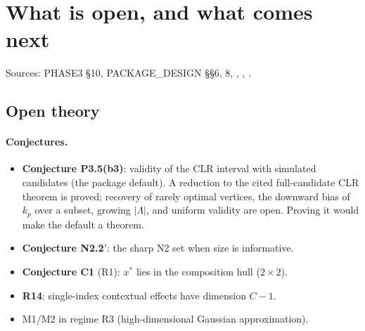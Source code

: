 \section{What is open, and what comes next}\label{sec:open}

Sources: PHASE3 \S10, PACKAGE\_DESIGN \S\S6, 8, ,
, .

\subsection{Open theory}

\paragraph{Conjectures.}
\begin{itemize}[nosep]
\item \textbf{Conjecture P3.5(b3)}: validity of the CLR interval with simulated
candidates (the package default). A reduction to the cited full-candidate CLR
theorem is proved; recovery of rarely optimal vertices, the downward bias of $k_p$
over a subset, growing $|\Lambda|$, and uniform validity are open. Proving it
would make the default a theorem.
\item \textbf{Conjecture N2.2$'$}: the sharp N2 set when size is informative.
\item \textbf{Conjecture C1} (R1): $x^*$ lies in the composition hull ($2\times2$).
\item \textbf{R14}: single-index contextual effects have dimension $C-1$.
\item M1/M2 in regime R3 (high-dimensional Gaussian approximation).
\end{itemize}

